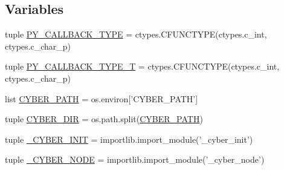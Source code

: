 \subsection*{Variables}
\begin{DoxyCompactItemize}
\item 
tuple \hyperlink{namespacecyber__py_1_1cyber_ae9dc2f6ce4ac3380ed0e7fef03ff278f}{P\-Y\-\_\-\-C\-A\-L\-L\-B\-A\-C\-K\-\_\-\-T\-Y\-P\-E} = ctypes.\-C\-F\-U\-N\-C\-T\-Y\-P\-E(ctypes.\-c\-\_\-int, ctypes.\-c\-\_\-char\-\_\-p)
\item 
tuple \hyperlink{namespacecyber__py_1_1cyber_a1e4152c96fe4765932b8125fe1f603fa}{P\-Y\-\_\-\-C\-A\-L\-L\-B\-A\-C\-K\-\_\-\-T\-Y\-P\-E\-\_\-\-T} = ctypes.\-C\-F\-U\-N\-C\-T\-Y\-P\-E(ctypes.\-c\-\_\-int, ctypes.\-c\-\_\-char\-\_\-p)
\item 
list \hyperlink{namespacecyber__py_1_1cyber_a512e2d9892caf9598327c8238f9099a7}{C\-Y\-B\-E\-R\-\_\-\-P\-A\-T\-H} = os.\-environ\mbox{[}'C\-Y\-B\-E\-R\-\_\-\-P\-A\-T\-H'\mbox{]}
\item 
tuple \hyperlink{namespacecyber__py_1_1cyber_a9ad5920bb49c68afc605b57816eda7d8}{C\-Y\-B\-E\-R\-\_\-\-D\-I\-R} = os.\-path.\-split(\hyperlink{namespacecyber__py_1_1cyber_a512e2d9892caf9598327c8238f9099a7}{C\-Y\-B\-E\-R\-\_\-\-P\-A\-T\-H})
\item 
tuple \hyperlink{namespacecyber__py_1_1cyber_a21aad6bb1a9e36085a1080ee9ef1de44}{\-\_\-\-C\-Y\-B\-E\-R\-\_\-\-I\-N\-I\-T} = importlib.\-import\-\_\-module('\-\_\-cyber\-\_\-init')
\item 
tuple \hyperlink{namespacecyber__py_1_1cyber_aebfa8caeeb1ae0bf47733f9c2a184f93}{\-\_\-\-C\-Y\-B\-E\-R\-\_\-\-N\-O\-D\-E} = importlib.\-import\-\_\-module('\-\_\-cyber\-\_\-node')
\end{DoxyCompactItemize}


